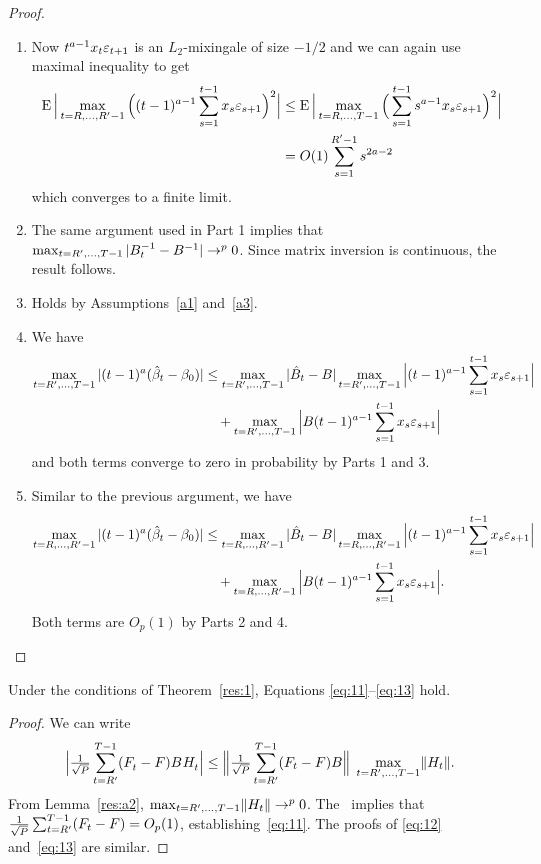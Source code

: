 \documentclass[12pt,fleqn]{article}
\newcommand{\WesA}[1][]{\ocltb{t}
  (F_t^{#1} - F) B^{#1} H_t^{#1}}
\begin{document}
\begin{proof}
\begin{enumerate}
  \item Now $t^{a-1} x_t \varepsilon_{t+1}$ is an $L_2$-mixingale of size
    $-1/2$ and we can again use  maximal inequality to get
    \begin{align*}
      \operatorname{E} \Big\lvert \max_{t=R,\dots,R'-1} \Big((t-1)^{a - 1} \sum_{s=1}^{t-1} x_s \varepsilon_{s+1} \Big)^2 \Big\rvert
      &\leq \operatorname{E} \Big\lvert \max_{t=R,\dots,T-1} \Big(\sum_{s=1}^{t-1} s^{a-1} x_s \varepsilon_{s+1} \Big)^2 \Big\rvert \\
      &= O(1) \sum_{s=1}^{R'-1} s^{2a - 2}
    \end{align*}
    which converges to a finite limit.
  \item The same argument used in Part 1 implies that $\max_{t=R',\dots,T-1} |
    B_t^{-1} - B^{-1}| \to^p 0$. Since matrix inversion is continuous,
    the result follows.
  \item Holds by Assumptions~\ref{a1} and~\ref{a3}.
  \item We have
    \begin{align*}
      \omaxb{t} | (t-1)^a (\hat{\beta}_t - \btrue) |
      &\leq \omaxb{t} |\hat{B}_t - B|
      \omaxb{t} \Big|(t-1)^{a-1} \sum_{s=1}^{t-1} x_s \ep_{s+1} \Big| \\
      &\quad + \omaxb{t} \Big| B (t-1)^{a-1} \sum_{s=1}^{t-1} x_s \ep_{s+1} \Big|
    \end{align*}
    and both terms converge to zero in probability by Parts 1 and 3.
  \item Similar to the previous argument, we have
    \begin{align*}
      \omaxc{t} | (t-1)^a (\hat{\beta}_t - \btrue) |
      & \leq \omaxc{t} | \hat{B}_t - B | \omaxc{t} \Big|(t-1)^{a-1} \sum_{s=1}^{t-1} x_s \ep_{s+1} \Big| \\
      &\quad + \omaxc{t} \Big| B (t-1)^{a-1} \sum_{s=1}^{t-1} x_s \ep_{s+1} \Big|.
    \end{align*}
    Both terms are $O_p(1)$ by Parts 2 and 4. \qedhere
  \end{enumerate}
\end{proof}

\begin{alem}\label{res:a4}
  Under the conditions of Theorem~\ref{res:1}, Equations
  \eqref{eq:11}--\eqref{eq:13} hold.
\end{alem}

\begin{proof}
We can write
\begin{equation*}
  \Big\lvert \WesA \Big\rvert \leq
  \Big\lVert \ocltb{t} (F_t - F) B \Big\rVert \;
  \omaxb{t} \lVert H_t \rVert.
\end{equation*}
From Lemma~\ref{res:a2}, $\max_{t=R',\dots,T-1} \lVert H_t \rVert \to^p 0$. The \clt\ implies
that $\tfrac{1}{\sqrt{P}} \sum_{t=R'}^{T-1} (F_t - F) = O_p(1)$,
establishing~\eqref{eq:11}. The proofs of \eqref{eq:12}
and~\eqref{eq:13} are similar.
\end{proof}


\end{document}
